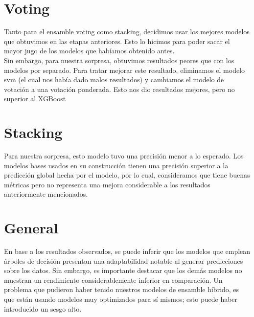 \documentclass{article}
\begin{document}
\section*{Voting} 
Tanto para el ensamble voting como stacking, decidimos usar los mejores modelos que obtuvimos en las etapas anteriores. Esto lo hicimos para poder sacar el mayor jugo de los modelos que habíamos obtenido antes. \\
Sin embargo, para nuestra sorpresa, obtuvimos resultados peores que con los modelos por separado. Para tratar mejorar este resultado, eliminamos el modelo svm (el cual nos había dado malos resultados) y cambiamos el modelo de votación a una votación ponderada. Esto nos dio resultados mejores, pero no superior al XGBoost


\section*{Stacking} 
Para nuestra sorpresa, esto modelo tuvo una precisión menor a lo esperado. Los modelos bases usados en su construcción tienen una precisión superior a la predicción global hecha por el modelo, por lo cual, consideramos que tiene buenas métricas pero no representa una mejora considerable a los resultados anteriormente mencionados.

\section*{General} 
En base a los resultados observados, se puede inferir que los modelos que emplean árboles de decisión presentan una adaptabilidad notable al generar predicciones sobre los datos. Sin embargo, es importante destacar que los demás modelos no muestran un rendimiento considerablemente inferior en comparación. Un problema que pudieron haber tenido nuestros modelos de ensamble híbrido, es que están usando modelos muy optimizados para sí mismos; esto puede haber introducido un sesgo alto. 
\end{document}
